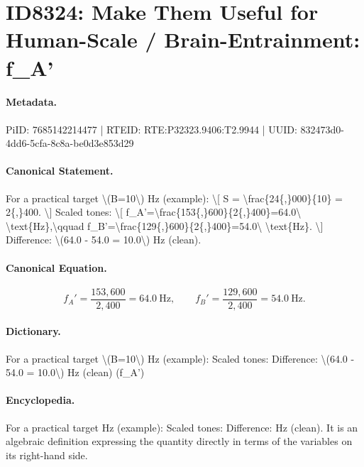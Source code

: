 \section*{ID8324: Make Them Useful for Human-Scale / Brain-Entrainment: f\_A'}
\paragraph{Metadata.}
PiID: 7685142214477 | RTEID: RTE:P32323.9406:T2.9944 | UUID: 832473d0-4dd6-5cfa-8c8a-be0d3e853d29

\paragraph{Canonical Statement.}
For a practical target \textbackslash{}(B=10\textbackslash{}) Hz (example): \textbackslash{}[ S = \textbackslash{}frac\{24\{,\}000\}\{10\} = 2\{,\}400. \textbackslash{}] Scaled tones: \textbackslash{}[ f\_A'=\textbackslash{}frac\{153\{,\}600\}\{2\{,\}400\}=64.0\textbackslash{} \textbackslash{}text\{Hz\},\textbackslash{}qquad f\_B'=\textbackslash{}frac\{129\{,\}600\}\{2\{,\}400\}=54.0\textbackslash{} \textbackslash{}text\{Hz\}. \textbackslash{}] Difference: \textbackslash{}(64.0 - 54.0 = 10.0\textbackslash{}) Hz (clean).

\paragraph{Canonical Equation.}
\[
f_A'=\frac{153{,}600}{2{,}400}=64.0\ \text{Hz},\qquad f_B'=\frac{129{,}600}{2{,}400}=54.0\ \text{Hz}.
\]

\paragraph{Dictionary.}
For a practical target \textbackslash{}(B=10\textbackslash{}) Hz (example): Scaled tones: Difference: \textbackslash{}(64.0 - 54.0 = 10.0\textbackslash{}) Hz (clean) (f\_A')

\paragraph{Encyclopedia.}
For a practical target Hz (example): Scaled tones: Difference: Hz (clean). It is an algebraic definition expressing the quantity directly in terms of the variables on its right-hand side.
